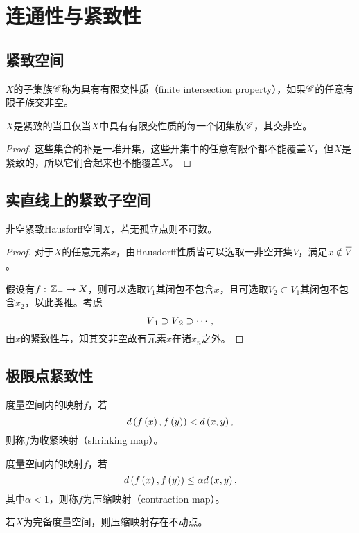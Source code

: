 \documentclass{ctexrep}
\begin{document}
  \section{连通性与紧致性}
  \subsection{紧致空间}
  \begin{definition}
    $X$的子集族$\mathscr{C}$称为具有有限交性质（finite intersection property），如果$\mathscr{C}$的任意有限子族交非空。
  \end{definition}
  \begin{theorem}
    \label{thm:finiteinters}
    $X$是紧致的当且仅当$X$中具有有限交性质的每一个闭集族$\mathscr{C}$，其交非空。
  \end{theorem}
  \begin{proof}
    这些集合的补是一堆开集，这些开集中的任意有限个都不能覆盖$X$，但$X$是紧致的，所以它们合起来也不能覆盖$X$。
  \end{proof}
  \subsection{实直线上的紧致子空间}
  \begin{theorem}
    \label{thm:uncountableR}
    非空紧致Hausforff空间$X$，若无孤立点则不可数。
  \end{theorem}
  \begin{proof}
    对于$X$的任意元素$x$，由Hausdorff性质皆可以选取一非空开集$V$，满足$x \notin \clo{V}$。\par
    假设有$f:\, \mathbb{Z}_+ \rightarrow X$，则可以选取$V_1$其闭包不包含$x$，且可选取$V_2 \subset V_1$其闭包不包含$x_2$，以此类推。考虑
    \[ \clo{V}_1 \supset \clo{V}_2 \supset \cdots, \]
    由$x$的紧致性与，知其交非空故有元素$x$在诸$x_n$之外。
  \end{proof}
  \subsection{极限点紧致性}
  \begin{definition}
    度量空间内的映射$f$，若
    \[ d\left(f\left(x\right),f\left(y\right)\right) < d\left(x,y\right), \]
    则称$f$为收紧映射（shrinking map）。
  \end{definition}
    \begin{definition}
    度量空间内的映射$f$，若
    \[ d\left(f\left(x\right),f\left(y\right)\right) \le \alpha d\left(x,y\right), \]
    其中$\alpha < 1$，则称$f$为压缩映射（contraction map）。
  \end{definition}
  \begin{theorem}
    \label{thm:fixp0}
    若$X$为完备度量空间，则压缩映射存在不动点。
  \end{theorem}


 
\ifx\allfiles\undefined %
\end{document}
